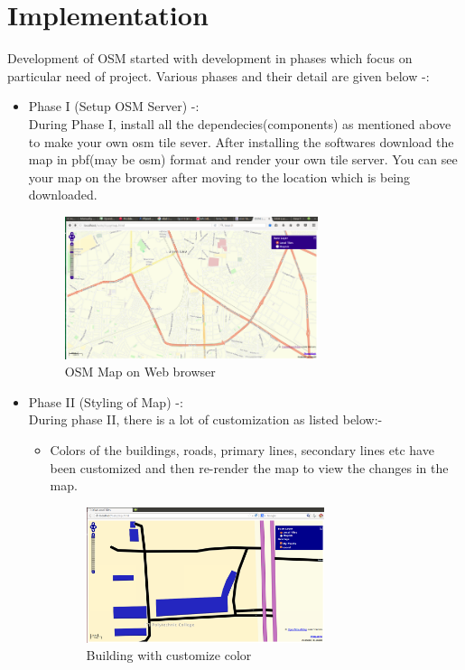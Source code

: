 \section{Implementation}
Development of OSM started with development in phases which focus on particular need of project.
Various phases and their detail are given below -:
\begin{itemize}
\item Phase I (Setup OSM Server) -: \\
        During Phase I, install all the dependecies(components) as mentioned above to make your own osm tile sever. After installing the softwares download the map in pbf(may be osm) format and render your own tile server. You can see your map on the browser after moving to the location which is being downloaded.

\begin{figure}[h!]
\centering \includegraphics[width=0.7\textwidth]{input/images/osm7.png}
\caption{OSM Map on Web browser}
\end{figure}

\iffalse

\item Phase II (Styling of Map) -: \\
        During phase II, there is a lot of customization as listed below:-
\begin{itemize}
\item Colors of the buildings, roads, primary lines, secondary lines etc have been customized and then re-render the map to view the changes in the map.
\begin{figure}[h!]
\centering \includegraphics[width=0.7\textwidth]{input/images/osm5.png}
\caption{Building with customize color}
\end{figure}


\end{itemize}
\end{itemize}
